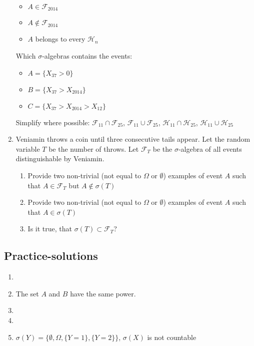 \documentclass[12pt, a4paper]{article}
\begin{document}
\begin{enumerate}
\begin{itemize}
\item $ A\in \mathcal{F}_{2014} $
\item $ A\notin \mathcal{F}_{2014} $
\item $A$ belongs to every $\mathcal{H}_{n}$
\end{itemize}

Which $ \sigma $-algebras contains the events:
\begin{itemize}
\item $ A= \{ X_{37}>0\}$
\item $ B=\{ X_{37}>X_{2014} \}$
\item $ C= \{X_{37}>X_{2014}>X_{12}\}$
\end{itemize}

Simplify where possible: $ \mathcal{F}_{11}\cap \mathcal{F}_{25} $, $ \mathcal{F}_{11}\cup \mathcal{F}_{25} $, $ \mathcal{H}_{11}\cap \mathcal{H}_{25} $, $ \mathcal{H}_{11}\cup \mathcal{H}_{25} $

\item Veniamin throws a coin until three consecutive tails appear.  Let the random variable $T$ be the number of throws. Let $ \mathcal{F}_{T} $ be the $ \sigma $-algebra of all events distinguishable by Veniamin.
\begin{enumerate}
\item Provide two non-trivial (not equal to $\Omega$ or $\emptyset$) examples of event $A$ such that $A\in  \mathcal{F}_{T}$ but $A\notin \sigma(T)$
\item Provide two non-trivial (not equal to $\Omega$ or $\emptyset$) examples of event $A$ such that $A\in  \sigma(T)$
\item Is it true, that $\sigma(T) \subset \mathcal{F}_{T}$?
\end{enumerate}

\end{enumerate}

\subsection{Practice-solutions}

\begin{enumerate}
\item
\item The set $A$ and $B$ have the same power.
\item
\item
\item $\sigma(Y)=\{ \emptyset, \Omega, \{Y=1\}, \{Y=2\} \}$, $\sigma(X)$ is not countable
\end{enumerate}
\end{document}
